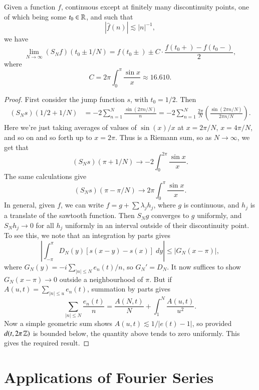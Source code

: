 \begin{theorem}
    Given a function $f$, continuous except at finitely many discontinuity points, one of which being some $t_0 \in \operatorname{\mathbb{R}}$, and such that
    \[ |\widehat{f}(n)| \lesssim |n|^{-1}, \]
    we have
    \[ \lim_{N \to \infty} (S_N f)(t_0 \pm 1/N) = f(t_0 \pm ) \pm C \cdot \frac{f(t_0+) - f(t_0-)}{2}, \]
    where
    \[ C = 2 \pi \int_0^\pi \frac{\sin x}{x} \approx 16.610. \]
\end{theorem}
\begin{proof}
    First consider the jump function $s$, with $t_0 = 1/2$. Then
    \begin{align*}
        (S_N s)(1/2 + 1/N) &= -2 \sum_{n = 1}^N \frac{\sin(2 \pi n/N)}{n} = -2  \sum_{n = 1}^N \frac{2 \pi }{N} \left( \frac{\sin(2 \pi n/N)}{2 \pi n / N} \right).
    \end{align*}
    Here we're just taking averages of values of $\sin(x)/x$ at $x = 2\pi/N$, $x = 4\pi/N$, and so on and so forth up to $x = 2 \pi$. Thus is a Riemann sum, so as $N \to \infty$, we get that
    \[ (S_N s)(\pi + 1/N) \to - 2 \int_0^{2\pi} \frac{\sin x}{x}. \]
    The same calculations give
    \[ (S_N s)(\pi - \pi/N) \to 2 \pi \int_0^\pi \frac{\sin x}{x}. \]
    In general, given $f$, we can write $f = g + \sum \lambda_j h_j$, where $g$ is continuous, and $h_j$ is a translate of the sawtooth function. Then $S_N g$ converges to $g$ uniformly, and $S_N h_j \to 0$ for all $h_j$ uniformly in an interval outside of their discontinuity point. To see this, we note that an integration by parts gives
    \[ \left| \int_{-\pi}^\pi D_N(y)[s(x-y) - s(x)]\; dy \right| \leq |G_N(x - \pi)|, \]
    where $G_N(y) = -i \sum_{|n| \leq N} e_n(t)/n$, so $G_N' = D_N$. It now suffices to show $G_N(x - \pi) \to 0$ outside a neighbourhood of $\pi$. But if $A(u,t) = \sum_{|n| \leq u} e_n(t)$, summation by parts gives
    \[ \sum_{|n| \leq N} \frac{e_n(t)}{n} = \frac{A(N,t)}{N} + \int_1^N \frac{A(u,t)}{u^2}. \]
    Now a simple geometric sum shows $A(u,t) \lesssim 1/|e(t) - 1|$, so provided $d(t, 2 \pi \operatorname{\mathbb{Z}})$ is bounded below, the quantity above tends to zero uniformly. This gives the required result.
\end{proof}

\chapter{Applications of Fourier Series}

